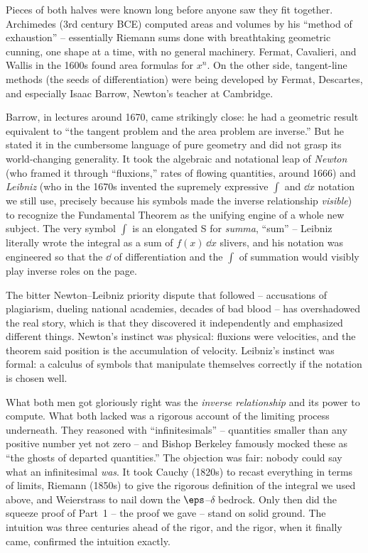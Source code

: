 \begin{historybox}
Pieces of both halves were known long before anyone saw they fit together.
Archimedes (3rd century BCE) computed areas and volumes by his ``method of
exhaustion'' -- essentially Riemann sums done with breathtaking geometric
cunning, one shape at a time, with no general machinery. Fermat, Cavalieri, and
Wallis in the 1600s found area formulas for $x^n$. On the other side, tangent-line
methods (the seeds of differentiation) were being developed by Fermat, Descartes,
and especially Isaac Barrow, Newton's teacher at Cambridge.

Barrow, in lectures around 1670, came strikingly close: he had a geometric
result equivalent to ``the tangent problem and the area problem are inverse.''
But he stated it in the cumbersome language of pure geometry and did not grasp
its world-changing generality. It took the algebraic and notational leap of
\emph{Newton} (who framed it through ``fluxions,'' rates of flowing quantities,
around 1666) and \emph{Leibniz} (who in the 1670s invented the supremely
expressive $\int$ and $\dd x$ notation we still use, precisely because his symbols
made the inverse relationship \emph{visible}) to recognize the Fundamental
Theorem as the unifying engine of a whole new subject. The very symbol $\int$ is
an elongated S for \emph{summa}, ``sum'' -- Leibniz literally wrote the integral
as a sum of $f(x)\,\dd x$ slivers, and his notation was engineered so that the
$\dd$ of differentiation and the $\int$ of summation would visibly play inverse
roles on the page.
\end{historybox}

\begin{historybox}
The bitter Newton--Leibniz priority dispute that followed -- accusations of
plagiarism, dueling national academies, decades of bad blood -- has overshadowed
the real story, which is that they discovered it independently and emphasized
different things. Newton's instinct was physical: fluxions were velocities, and
the theorem said position is the accumulation of velocity. Leibniz's instinct was
formal: a calculus of symbols that manipulate themselves correctly if the
notation is chosen well.

What both men got gloriously right was the \emph{inverse relationship} and its
power to compute. What both lacked was a rigorous account of the limiting process
underneath. They reasoned with ``infinitesimals'' -- quantities smaller than any
positive number yet not zero -- and Bishop Berkeley famously mocked these as ``the
ghosts of departed quantities.'' The objection was fair: nobody could say what an
infinitesimal \emph{was}. It took Cauchy (1820s) to recast everything in terms of
limits, Riemann (1850s) to give the rigorous definition of the integral we used
above, and Weierstrass to nail down the $\eps$--$\delta$ bedrock. Only then did
the squeeze proof of Part~1 -- the proof we gave -- stand on solid ground. The
intuition was three centuries ahead of the rigor, and the rigor, when it finally
came, confirmed the intuition exactly.
\end{historybox}

